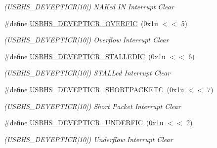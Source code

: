 \begin{DoxyCompactItemize}
\begin{DoxyCompactList}\small\item\em (U\+S\+B\+H\+S\+\_\+\+D\+E\+V\+E\+P\+T\+I\+CR\mbox{[}10\mbox{]}) N\+A\+Ked IN Interrupt Clear \end{DoxyCompactList}\item 
\mbox{\label{group__SAME70__USBHS_ga86269e7c828e6f56daa4d6d164cba205}} 
\#define \mbox{\hyperlink{group__SAME70__USBHS_ga86269e7c828e6f56daa4d6d164cba205}{U\+S\+B\+H\+S\+\_\+\+D\+E\+V\+E\+P\+T\+I\+C\+R\+\_\+\+O\+V\+E\+R\+F\+IC}}~(0x1u $<$$<$ 5)
\begin{DoxyCompactList}\small\item\em (U\+S\+B\+H\+S\+\_\+\+D\+E\+V\+E\+P\+T\+I\+CR\mbox{[}10\mbox{]}) Overflow Interrupt Clear \end{DoxyCompactList}\item 
\mbox{\label{group__SAME70__USBHS_gaa8e26b5bde4aa55a5ccbf652d66eb58c}} 
\#define \mbox{\hyperlink{group__SAME70__USBHS_gaa8e26b5bde4aa55a5ccbf652d66eb58c}{U\+S\+B\+H\+S\+\_\+\+D\+E\+V\+E\+P\+T\+I\+C\+R\+\_\+\+S\+T\+A\+L\+L\+E\+D\+IC}}~(0x1u $<$$<$ 6)
\begin{DoxyCompactList}\small\item\em (U\+S\+B\+H\+S\+\_\+\+D\+E\+V\+E\+P\+T\+I\+CR\mbox{[}10\mbox{]}) S\+T\+A\+L\+Led Interrupt Clear \end{DoxyCompactList}\item 
\mbox{\label{group__SAME70__USBHS_ga157a85d1247175cdabb46c823d30dcc7}} 
\#define \mbox{\hyperlink{group__SAME70__USBHS_ga157a85d1247175cdabb46c823d30dcc7}{U\+S\+B\+H\+S\+\_\+\+D\+E\+V\+E\+P\+T\+I\+C\+R\+\_\+\+S\+H\+O\+R\+T\+P\+A\+C\+K\+E\+TC}}~(0x1u $<$$<$ 7)
\begin{DoxyCompactList}\small\item\em (U\+S\+B\+H\+S\+\_\+\+D\+E\+V\+E\+P\+T\+I\+CR\mbox{[}10\mbox{]}) Short Packet Interrupt Clear \end{DoxyCompactList}\item 
\mbox{\label{group__SAME70__USBHS_ga62fa84e30ca3a2de864ec235f99b1fb2}} 
\#define \mbox{\hyperlink{group__SAME70__USBHS_ga62fa84e30ca3a2de864ec235f99b1fb2}{U\+S\+B\+H\+S\+\_\+\+D\+E\+V\+E\+P\+T\+I\+C\+R\+\_\+\+U\+N\+D\+E\+R\+F\+IC}}~(0x1u $<$$<$ 2)
\begin{DoxyCompactList}\small\item\em (U\+S\+B\+H\+S\+\_\+\+D\+E\+V\+E\+P\+T\+I\+CR\mbox{[}10\mbox{]}) Underflow Interrupt Clear \end{DoxyCompactList}\item 

\end{DoxyCompactItemize}
